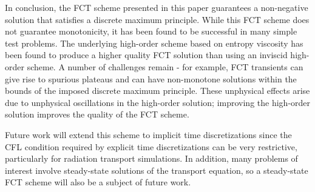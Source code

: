 In conclusion, the FCT scheme presented in this paper guarantees
a non-negative solution that satisfies a discrete maximum principle.
While this FCT scheme does not guarantee monotonicity, it has been
found to be successful in many simple test problems. The underlying
high-order scheme based on entropy viscosity has been found to
produce a higher quality FCT solution than using an inviscid
high-order scheme. A number of challenges remain - for example,
FCT transients can give rise to spurious plateaus and can have non-monotone
solutions within the bounds of the imposed discrete maximum principle.
These unphysical effects arise due to unphysical oscillations in the
high-order solution; improving the high-order solution improves
the quality of the FCT scheme.

Future work will extend this scheme to implicit time
discretizations since the CFL condition required by explicit time
discretizations can be very restrictive, particularly for radiation transport simulations.
In addition, many problems of interest involve steady-state solutions
of the transport equation, so a steady-state FCT scheme will also be
a subject of future work.

